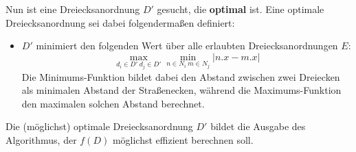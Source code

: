 \documentclass[a4paper, notitlepage, 12pt,headinclude]{scrartcl}
\begin{document}
Nun ist eine Dreiecksanordnung $D'$ gesucht, die \textbf{optimal} ist. Eine optimale Dreiecksanordnung sei dabei folgendermaßen definiert:
\begin{itemize}
	\item $D'$ minimiert den folgenden Wert über alle erlaubten Dreiecksanordnungen $E$:
	\begin{equation}
	\max_{d_i \in D' ~ d_j \in D'} \min_{n \in N_i ~ m \in N_j} | n.x - m.x |
	\end{equation}
	Die Minimums-Funktion bildet dabei den Abstand zwischen zwei Dreiecken als minimalen Abstand der Straßenecken, während die Maximums-Funktion den maximalen solchen Abstand berechnet.
\end{itemize}
 Die (möglichst) optimale Dreiecksanordnung $D'$ bildet die Ausgabe des Algorithmus, der $f(D)$ möglichst effizient berechnen soll.
\end{document}
